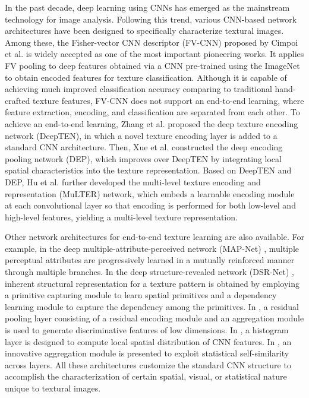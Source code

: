 \documentclass{aci}
\numberwithin{equation}{section}
\begin{document}
In the past decade, deep learning using CNNs has emerged as the mainstream
technology for image analysis. Following this trend, various CNN-based network
architectures have been designed to specifically characterize textural images.
Among these, the Fisher-vector CNN descriptor (FV-CNN) proposed by Cimpoi et
al. \cite{cimpoi_deep_2015} is widely accepted as one of the most important
pioneering works. It applies FV pooling to deep features obtained via a CNN
pre-trained using the ImageNet \cite{krizhevsky_imagenet_2017} to obtain encoded features
for texture classification. Although it is capable of achieving much improved
classification accuracy comparing to traditional hand-crafted texture features,
FV-CNN does not support an end-to-end learning, where feature extraction,
encoding, and classification are separated from each other. To achieve an
end-to-end learning, Zhang et al. \cite{zhang_deep_2017} proposed the deep texture
encoding network (DeepTEN), in which a novel texture encoding layer is added to
a standard CNN architecture. Then, Xue et al. \cite{xue_deep_2018} constructed the
deep encoding pooling network (DEP), which improves over DeepTEN by integrating
local spatial characteristics into the texture representation. Based on DeepTEN
and DEP, Hu et al. \cite{hu_multi_2019} further developed the multi-level texture
encoding and representation (MuLTER) network, which embeds a learnable encoding
module at each convolutional layer so that encoding is performed for both
low-level and high-level features, yielding a multi-level texture
representation.

Other network architectures for end-to-end texture learning are also available.
For example, in the deep multiple-attribute-perceived network (MAP-Net)
\cite{zhai_deep_2019}, multiple perceptual attributes are progressively learned
in a mutually reinforced manner through multiple branches. In the deep
structure-revealed network (DSR-Net) \cite{zhai_deep_2020}, inherent structural
representation for a texture pattern is obtained by employing a primitive
capturing module to learn spatial primitives and a dependency learning module to
capture the dependency among the primitives. In \cite{mao_deep_2021}, a residual
pooling layer consisting of a residual encoding module and an aggregation module
is used to generate discriminative features of low dimensions. In
\cite{peeples_histogram_2021}, a histogram layer is designed to compute local
spatial distribution of CNN features. In \cite{chen_deep_2021}, an innovative
aggregation module is presented to exploit statistical self-similarity across
layers. All these architectures customize the standard CNN structure to
accomplish the characterization of certain spatial, visual, or statistical
nature unique to textural images.
\end{document}
